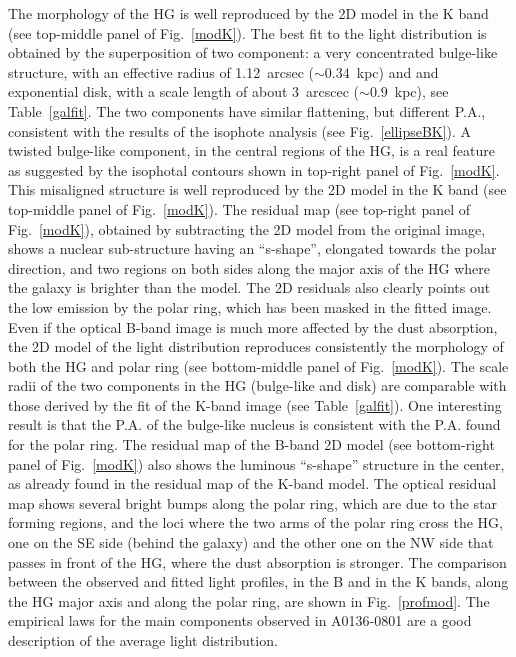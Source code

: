 \documentclass[useAMS,usenatbib]{mn2e}
\begin{document}
The morphology of the HG is well reproduced by the 2D model in the K
band (see top-middle panel of Fig.~\ref{modK}). The best fit to the
light distribution is obtained by the superposition of two component:
a very concentrated bulge-like structure, with an effective radius of
1.12~arcsec ($\sim0.34$~kpc) and and exponential disk, with a scale
length of about 3~arcscec ($\sim0.9$~kpc), see Table~\ref{galfit}. The
two components have similar flattening, but different P.A., consistent
with the results of the isophote analysis (see Fig.~\ref{ellipseBK}).
A twisted bulge-like component, in the central regions of the HG, is a
real feature as suggested by the isophotal contours shown in top-right
panel of Fig.~\ref{modK}. This misaligned structure is well reproduced
by the 2D model in the K band (see top-middle panel of
Fig.~\ref{modK}). The residual map
(see top-right panel of Fig.~\ref{modK}), obtained by subtracting the
2D model from the original image, shows a nuclear sub-structure having
an ``s-shape'', elongated towards the polar direction, and two regions
on both sides along the major axis of the HG where the galaxy is
brighter than the model. The 2D residuals also clearly points out the
low emission by the polar ring, which has been masked in the fitted
image.  Even if the optical B-band image is much more affected by the
dust absorption, the 2D model of the light distribution reproduces
consistently the morphology of both the HG and polar ring (see
bottom-middle panel of Fig.~\ref{modK}). The scale radii of the two
components in the HG (bulge-like and disk) are comparable with those
derived by the fit of the K-band image (see Table~\ref{galfit}). One
interesting result is that the P.A. of the bulge-like nucleus is
consistent with the P.A. found for the polar ring. The residual map of
the B-band 2D model (see bottom-right panel of Fig.~\ref{modK}) also
shows the luminous ``s-shape'' structure in the center, as already found
in the residual map of the K-band model. The optical residual map
shows several bright bumps along the polar ring, which are due to the
star forming regions, and the loci where the two arms of the polar
ring cross the HG, one on the SE side (behind the galaxy) and the
other one on the NW side that passes in front of the HG, where
the dust absorption is stronger.  The comparison between the observed
and fitted light profiles, in the B and in the K bands, along the HG
major axis and along the polar ring, are shown in
Fig.~\ref{profmod}. The empirical laws for the main components
observed in A0136-0801 are a good description of the average light
distribution.
\end{document}
